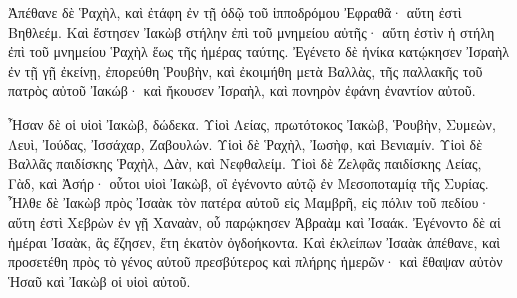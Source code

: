 {Ἀπέθανε δὲ Ῥαχὴλ, καὶ ἐτάφη ἐν τῇ ὁδῷ τοῦ ἱπποδρόμου Ἐφραθᾶ· αὕτη ἐστὶ Βηθλεέμ.
Καὶ ἔστησεν Ἰακὼβ στήλην ἐπὶ τοῦ μνημείου αὐτῆς· αὕτη ἐστὶν ἡ στήλη ἐπὶ τοῦ μνημείου Ῥαχὴλ ἕως τῆς ἡμέρας ταύτης.
Ἐγένετο δὲ ἡνίκα κατῴκησεν Ἰσραὴλ ἐν τῇ γῇ ἐκείνῃ, ἐπορεύθη Ῥουβὴν, καὶ ἐκοιμήθη μετὰ Βαλλὰς, τῆς παλλακῆς τοῦ πατρὸς αὐτοῦ Ἰακώβ· καὶ ἤκουσεν Ἰσραὴλ, καὶ πονηρὸν ἐφάνη ἐναντίον αὐτοῦ.
\par }{\PP Ἦσαν δὲ οἱ υἱοὶ Ἰακὼβ, δώδεκα.
Υἱοὶ Λείας, πρωτότοκος Ἰακὼβ, Ῥουβὴν, Συμεὼν, Λευὶ, Ἰούδας, Ἰσσάχαρ, Ζαβουλών.
Υἱοὶ δὲ Ῥαχὴλ, Ἰωσὴφ, καὶ Βενιαμίν.
Υἱοὶ δὲ Βαλλᾶς παιδίσκης Ῥαχὴλ, Δὰν, καὶ Νεφθαλείμ.
Υἱοὶ δὲ Ζελφᾶς παιδίσκης Λείας, Γὰδ, καὶ Ἀσήρ· οὗτοι υἱοὶ Ἰακὼβ, οἳ ἐγένοντο αὐτῷ ἐν Μεσοποταμίᾳ τῆς Συρίας.
Ἦλθε δὲ Ἰακὼβ πρὸς Ἰσαὰκ τὸν πατέρα αὐτοῦ εἰς Μαμβρῆ, εἰς πόλιν τοῦ πεδίου· αὕτη ἐστὶ Χεβρὼν ἐν γῇ Χαναὰν, οὗ παρῴκησεν Ἁβραὰμ καὶ Ἰσαάκ.
Ἐγένοντο δὲ αἱ ἡμέραι Ἰσαὰκ, ἃς ἔζησεν, ἔτη ἑκατὸν ὀγδοήκοντα.
Καὶ ἐκλείπων Ἰσαὰκ ἀπέθανε, καὶ προσετέθη πρὸς τὸ γένος αὐτοῦ πρεσβύτερος καὶ πλήρης ἡμερῶν· καὶ ἔθαψαν αὐτὸν Ἡσαῦ καὶ Ἰακὼβ οἱ υἱοὶ αὐτοῦ.

}
